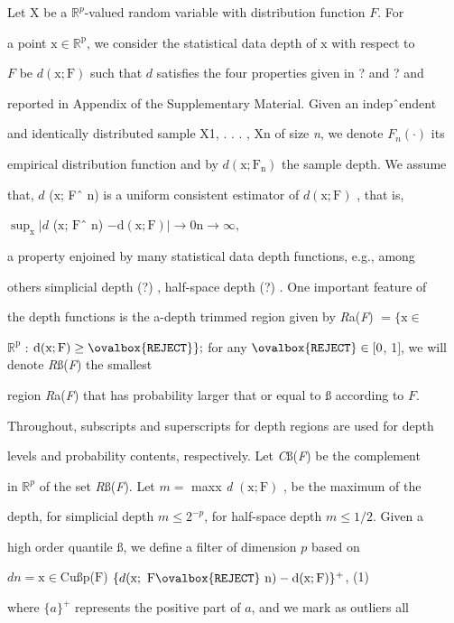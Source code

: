 \documentclass[a4paper,12pt]{article}
\begin{document}
Let X be a $\mathbb{R}^{p}$-valued random variable with distribution function $F$. For

a point $\mathrm{x}\in \mathbb{R}^{\mathrm{p}}$, we consider the statistical data depth of $\mathrm{x}$ with respect to

$F$ be $d(\mathrm{x};\mathrm{F})$ such that $d$ satisfies the four properties given in ? and ? and

reported in Appendix of the Supplementary Material. Given an indepˆendent

and identically distributed sample X1, . . . , Xn of size {\it n}, we denote $F_{n}(\cdot)$ its

empirical distribution function and by $d(\mathrm{x};\mathrm{F}_{\mathrm{n}})$ the sample depth. We assume

that, $d$ ($\mathrm{x}$; Fˆ n) is a uniform consistent estimator of $d(\mathrm{x};\mathrm{F})$ , that is,
\begin{center}
$\displaystyle \sup_{\mathrm{x}}|d$ ($\mathrm{x}$; $\mathrm{F}$ˆ $\mathrm{n}$) $-\mathrm{d}(\mathrm{x};\mathrm{F})|\rightarrow 0 \mathrm{n}\rightarrow\infty,$
\end{center}
a property enjoined by many statistical data depth functions, e.g., among

others simplicial depth (?) , half-space depth (?) . One important feature of

the depth functions is the a-depth trimmed region given by {\it R}a({\it F}) $= \{\mathrm{x}\in$

$\mathbb{R}^{\mathrm{p}}$ : $\mathrm{d}(\mathrm{x};\mathrm{F}) \geq\ovalbox{\tt\small REJECT}\};$ for any $\ovalbox{\tt\small REJECT}\in [0$, 1$]$, we will denote {\it R}ß({\it F}) the smallest

region {\it R}a({\it F}) that has probability larger that or equal to ß according to $F.$

Throughout, subscripts and superscripts for depth regions are used for depth

levels and probability contents, respectively. Let {\it C}ß({\it F}) be the complement

in $\mathbb{R}^{p}$ of the set {\it R}ß({\it F}). Let $m =$ maxx {\it d} $(\mathrm{x};\mathrm{F})$ , be the maximum of the

depth, for simplicial depth $m\leq 2^{-p}$, for half-space depth $ m\leq 1/2$. Given a

high order quantile ß, we define a filter of dimension $p$ based on
\begin{center}
$dn=\mathrm{x}\in \mathrm{C}\mathrm{u}$ß$\mathrm{p}$($\mathrm{F}$) $\{d(\mathrm{x};\ \mathrm{F}\ovalbox{\tt\small REJECT}\ \mathrm{n})-\mathrm{d}(\mathrm{x};\mathrm{F})\}^{+}$,   (1)
\end{center}
where $\{a\}^{+}$ represents the positive part of $a$, and we mark as outliers all
\end{document}
